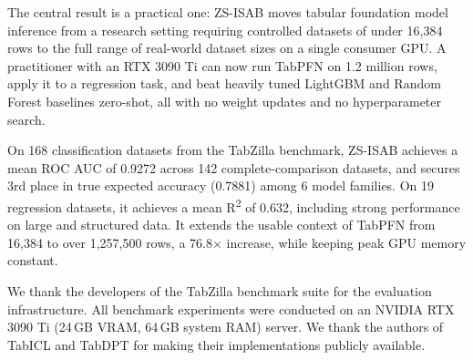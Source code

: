 \documentclass[10pt]{article}
\begin{document}
The central result is a practical one: ZS-ISAB moves tabular foundation model inference from a research setting requiring controlled datasets of under 16{,}384 rows to the full range of real-world dataset sizes on a single consumer GPU. A practitioner with an RTX 3090 Ti can now run TabPFN on 1.2 million rows, apply it to a regression task, and beat heavily tuned LightGBM and Random Forest baselines zero-shot, all with no weight updates and no hyperparameter search.

On 168 classification datasets from the TabZilla benchmark, ZS-ISAB achieves a mean ROC AUC of 0.9272 across 142 complete-comparison datasets, and secures 3rd place in true expected accuracy (0.7881) among 6 model families. On 19 regression datasets, it achieves a mean R\textsuperscript{2} of 0.632, including strong performance on large and structured data. It extends the usable context of TabPFN from 16{,}384 to over 1{,}257{,}500 rows, a 76.8$\times$ increase, while keeping peak GPU memory constant.

We thank the developers of the TabZilla benchmark suite for the evaluation infrastructure. All benchmark experiments were conducted on an NVIDIA RTX 3090 Ti (24\,GB VRAM, 64\,GB system RAM) server. We thank the authors of TabICL and TabDPT for making their implementations publicly available.



\end{document}
